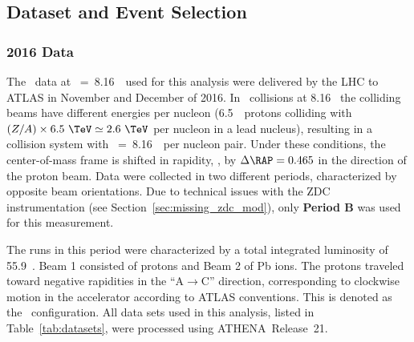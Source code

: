 \subsection{Dataset and Event Selection}

\subsubsection{2016 \texorpdfstring{\pxPb}{p+Pb} Data}
The \pxPb\ data at \SNN~=~8.16~\TeV\ used for this analysis were delivered by the LHC to ATLAS in November and December of 2016. In \pxPb\ collisions at 8.16 \TeV\ the colliding beams have different energies per nucleon (6.5~\TeV\ protons colliding with $(Z/A)\times 6.5~\TeV\simeq 2.6~\TeV$ per nucleon in a lead nucleus), resulting in a collision system with \SNN~=~8.16~\TeV\ per nucleon pair. Under these conditions, the center-of-mass frame is shifted in rapidity, \RAP, by $\Delta\RAP=0.465$ in the direction of the proton beam. Data were collected in two different periods, characterized by opposite beam orientations. Due to technical issues with the ZDC instrumentation (see Section~\ref{sec:missing_zdc_mod}), only \textbf{Period B} was used for this measurement.

The runs in this period were characterized by a total integrated luminosity of 55.9~\NB. Beam 1 consisted of protons and Beam 2 of Pb ions. The protons traveled toward negative rapidities in the ``A$\rightarrow$C'' direction, corresponding to clockwise motion in the accelerator according to ATLAS conventions. This is denoted as the \pxPb\ configuration. All data sets used in this analysis, listed in Table~\ref{tab:datasets}, were processed using \textsc{ATHENA}~Release~21.


